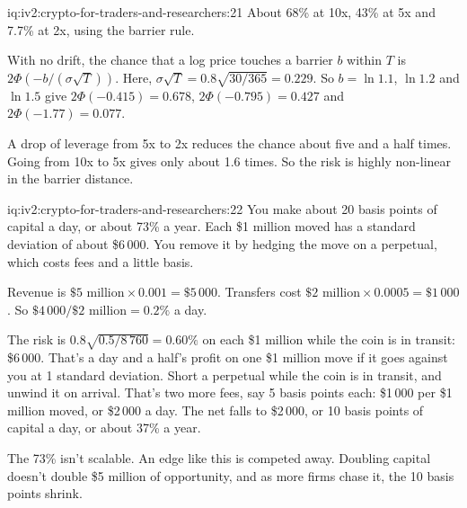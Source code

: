 \begin{solution}{iq:iv2:crypto-for-traders-and-researchers:21}
About 68\% at 10x, 43\% at 5x and 7.7\% at 2x, using the barrier rule.

With no drift, the chance that a log price touches a barrier $b$ within $T$ is $2\Phi(-b/(\sigma\sqrt{T}))$. Here, $\sigma\sqrt{T} = 0.8\sqrt{30/365} = 0.229$. So $b = \ln 1.1$, $\ln 1.2$ and $\ln 1.5$ give $2\Phi(-0.415) = 0.678$, $2\Phi(-0.795) = 0.427$ and $2\Phi(-1.77) = 0.077$.

A drop of leverage from 5x to 2x reduces the chance about five and a half times. Going from 10x to 5x gives only about 1.6 times. So the risk is highly non-linear in the barrier distance.

\end{solution}

\begin{solution}{iq:iv2:crypto-for-traders-and-researchers:22}
You make about 20 basis points of capital a day, or about 73\% a year. Each \$1 million moved has a standard deviation of about \$6\,000. You remove it by hedging the move on a perpetual, which costs fees and a little basis.

Revenue is $\$5 \text{ million} \times 0.001 = \$5\,000$. Transfers cost $\$2 \text{ million} \times 0.0005 = \$1\,000$. So $\$4\,000/\$2 \text{ million} = 0.2\%$ a day.

The risk is $0.8\sqrt{0.5/8\,760} = 0.60\%$ on each \$1 million while the coin is in transit: \$6\,000. That's a day and a half's profit on one \$1 million move if it goes against you at 1 standard deviation. Short a perpetual while the coin is in transit, and unwind it on arrival. That's two more fees, say 5 basis points each: \$1\,000 per \$1 million moved, or \$2\,000 a day. The net falls to \$2\,000, or 10 basis points of capital a day, or about 37\% a year.

The 73\% isn't scalable. An edge like this is competed away. Doubling capital doesn't double \$5 million of opportunity, and as more firms chase it, the 10 basis points shrink.

\end{solution}

